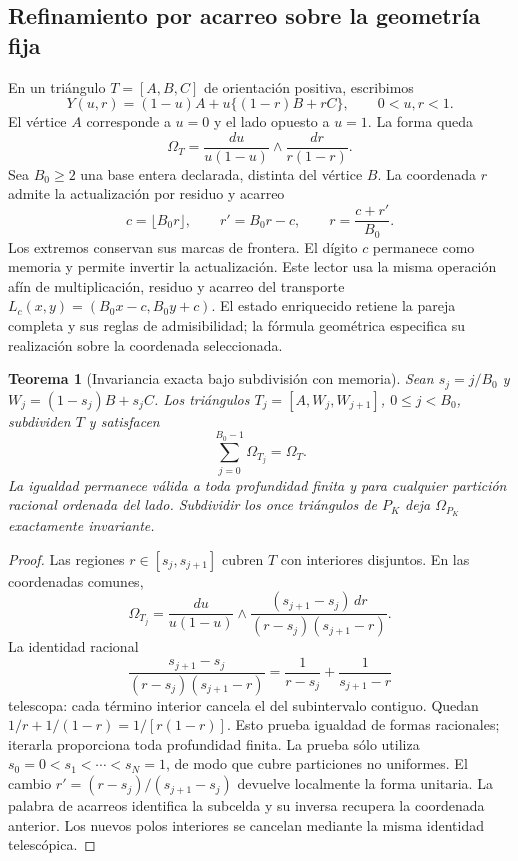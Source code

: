 \documentclass[a4paper,10pt]{article}
\newtheorem{theorem}{Teorema}[section]
\theoremstyle{definition}\newtheorem{definition}[theorem]{Definición}
\theoremstyle{remark}\newtheorem{remark}[theorem]{Observación}
\numberwithin{equation}{section}
\begin{document}
\subsection{Refinamiento por acarreo sobre la geometría fija}

En un triángulo \(T=[A,B,C]\) de orientación positiva, escribimos
\begin{equation}
 Y(u,r)=(1-u)A+u\{(1-r)B+rC\},\qquad 0<u,r<1.
 \label{eq:polygon-blowdown}
\end{equation}
El vértice \(A\) corresponde a \(u=0\) y el lado opuesto a \(u=1\).
La forma queda
\begin{equation}
 \Omega_T=\frac{du}{u(1-u)}\wedge\frac{dr}{r(1-r)}.
 \label{eq:polygon-product-form}
\end{equation}
Sea \(B_0\geq2\) una base entera declarada, distinta del vértice \(B\).
La coordenada \(r\) admite la actualización por residuo y acarreo
\begin{equation}
 c=\lfloor B_0r\rfloor,\qquad r'=B_0r-c,\qquad
 r=\frac{c+r'}{B_0}.
 \label{eq:polygon-carry}
\end{equation}
Los extremos conservan sus marcas de frontera. El dígito \(c\) permanece
como memoria y permite invertir la actualización. Este lector usa la
misma operación afín de multiplicación, residuo y acarreo del transporte
\(L_c(x,y)=(B_0x-c,B_0y+c)\). El estado enriquecido retiene la pareja
completa y sus reglas de admisibilidad; la fórmula geométrica especifica
su realización sobre la coordenada seleccionada.

\begin{theorem}[Invariancia exacta bajo subdivisión con memoria]
\label{thm:polygon-carry}
Sean \(s_j=j/B_0\) y \(W_j=(1-s_j)B+s_jC\).
Los triángulos \(T_j=[A,W_j,W_{j+1}]\), \(0\leq j<B_0\), subdividen
\(T\) y satisfacen
\begin{equation}
 \sum_{j=0}^{B_0-1}\Omega_{T_j}=\Omega_T.
 \label{eq:polygon-carry-additivity}
\end{equation}
La igualdad permanece válida a toda profundidad finita y para cualquier
partición racional ordenada del lado. Subdividir los once triángulos
de \(P_K\) deja \(\Omega_{P_K}\) exactamente invariante.
\end{theorem}
\begin{proof}
Las regiones \(r\in[s_j,s_{j+1}]\) cubren \(T\) con interiores disjuntos.
En las coordenadas comunes,
\[
 \Omega_{T_j}=\frac{du}{u(1-u)}\wedge
 \frac{(s_{j+1}-s_j)\,dr}{(r-s_j)(s_{j+1}-r)}.
\]
La identidad racional
\[
 \frac{s_{j+1}-s_j}{(r-s_j)(s_{j+1}-r)}
 =\frac1{r-s_j}+\frac1{s_{j+1}-r}
\]
telescopa: cada término interior cancela el del subintervalo contiguo.
Quedan \(1/r+1/(1-r)=1/[r(1-r)]\). Esto prueba igualdad de formas
racionales; iterarla proporciona toda profundidad finita.
La prueba sólo utiliza \(s_0=0<s_1<\cdots<s_N=1\), de modo que cubre
particiones no uniformes. El cambio
\(r'=(r-s_j)/(s_{j+1}-s_j)\) devuelve localmente la forma unitaria.
La palabra de acarreos identifica la subcelda y su inversa recupera la
coordenada anterior. Los nuevos polos interiores se cancelan mediante
la misma identidad telescópica.
\end{proof}
\end{document}
